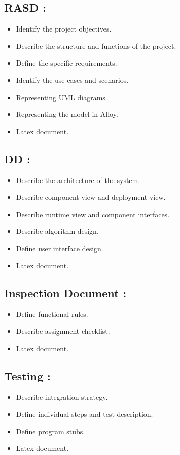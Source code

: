\documentclass[11pt, a4paper,titlepage]{article}
\begin{document}
	\subsection{RASD :}
	\begin{itemize}
		\item Identify the project objectives.
		\item Describe the structure and functions of the project.
		\item Define the specific requirements.
		\item Identify the use cases and scenarios.
		\item Representing UML diagrams.
		\item Representing the model in Alloy.
		\item Latex document.
	\end{itemize}

	\subsection{DD :}
	\begin{itemize}
		\item Describe the architecture of the system.
		\item Describe component view and deployment view.
		\item Describe runtime view and component interfaces.
		\item Describe algorithm design.
		\item Define user interface design.
		\item Latex document.
	\end{itemize}
	
	\subsection{Inspection Document :}
	\begin{itemize}
		\item Define functional rules.
		\item Describe assignment checklist.
		\item Latex document.
	\end{itemize}
	
	\subsection{Testing :}
	\begin{itemize}
		\item Describe integration strategy.
		\item Define individual steps and test description.
		\item Define program stubs.
		\item Latex document.
	\end{itemize}
	
\end{document}
